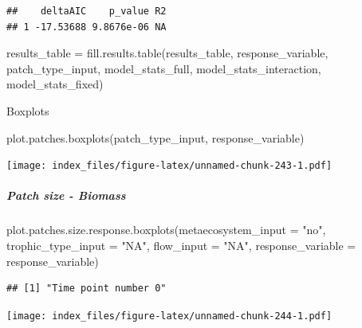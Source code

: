 \documentclass[
]{article}
\newenvironment{Shaded}{\begin{snugshade}}{\end{snugshade}}
\newcommand{\AttributeTok}[1]{\textcolor[rgb]{0.77,0.63,0.00}{#1}}
\newcommand{\FunctionTok}[1]{\textcolor[rgb]{0.00,0.00,0.00}{#1}}
\newcommand{\NormalTok}[1]{#1}
\newcommand{\OtherTok}[1]{\textcolor[rgb]{0.56,0.35,0.01}{#1}}
\newcommand{\StringTok}[1]{\textcolor[rgb]{0.31,0.60,0.02}{#1}}
\begin{document}
\begin{verbatim}
##    deltaAIC    p_value R2
## 1 -17.53688 9.8676e-06 NA
\end{verbatim}

\begin{Shaded}
\begin{Highlighting}[]
\NormalTok{results\_table }\OtherTok{=} \FunctionTok{fill.results.table}\NormalTok{(results\_table,}
\NormalTok{                                   response\_variable,}
\NormalTok{                                   patch\_type\_input,}
\NormalTok{                                   model\_stats\_full,}
\NormalTok{                                   model\_stats\_interaction,}
\NormalTok{                                   model\_stats\_fixed)}
\end{Highlighting}
\end{Shaded}

Boxplots

\begin{Shaded}
\begin{Highlighting}[]
\FunctionTok{plot.patches.boxplots}\NormalTok{(patch\_type\_input,}
\NormalTok{                       response\_variable)}
\end{Highlighting}
\end{Shaded}

\texttt{[image: index\_files/figure-latex/unnamed-chunk-243-1.pdf]}

\hypertarget{patch-size---biomass}{%
\subparagraph{Patch size - Biomass}\label{patch-size---biomass}}

\begin{Shaded}
\begin{Highlighting}[]
\FunctionTok{plot.patches.size.response.boxplots}\NormalTok{(}\AttributeTok{metaecosystem\_input =} \StringTok{"no"}\NormalTok{,}
                                  \AttributeTok{trophic\_type\_input =} \StringTok{"NA"}\NormalTok{,}
                                  \AttributeTok{flow\_input =} \StringTok{"NA"}\NormalTok{,}
                                  \AttributeTok{response\_variable =}\NormalTok{ response\_variable)}
\end{Highlighting}
\end{Shaded}

\begin{verbatim}
## [1] "Time point number 0"
\end{verbatim}

\texttt{[image: index\_files/figure-latex/unnamed-chunk-244-1.pdf]}
\end{document}
